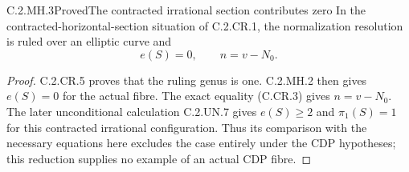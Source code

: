 \begin{statement}{C.2.MH.3}{Proved}{The contracted irrational section contributes zero}
In the contracted-horizontal-section situation of
C.2.CR.1, the normalization resolution is ruled over
an elliptic curve and
\[
                    e(S)=0,\qquad n=v-N_0.
 \tag{C.MH.15}
\]
\end{statement}
\begin{proof}
C.2.CR.5 proves that the ruling genus is one.
C.2.MH.2 then gives $e(S)=0$ for the actual fibre.
The exact equality (C.CR.3) gives $n=v-N_0$.
The later unconditional calculation C.2.UN.7
gives $e(S)\ge2$ and $\pi_1(S)=1$ for this
contracted irrational configuration. Thus its
comparison with the necessary equations here
excludes the case entirely under the CDP
hypotheses; this reduction supplies no example
of an actual CDP fibre.
\end{proof}



